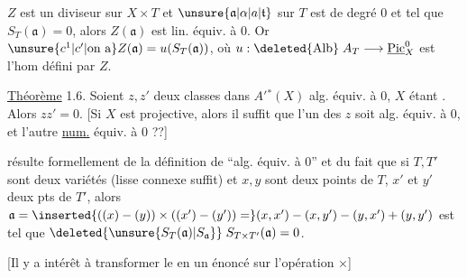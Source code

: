 $Z$ est un diviseur sur $X\times T$ et $\unsure{\mathfrak{a}|\alpha|a|\mathfrak{t}}$ sur $T$ est de degré $0$ et tel que $S_T(\mathfrak{a})=0$, alors $Z(\mathfrak{a})$ est lin. équiv. à $0$. Or $\unsure{c^1|c'|\text{on a}}Z(\mathfrak{a})=u(S_T(\mathfrak{a}))$, où $u:\deleted{\mathrm{Alb}}\;A_T\longrightarrow\underline{\mathrm{Pic}}_X^0$ est l'hom défini par $Z$.

\uline{Théorème} 1.6. Soient $z,z'$ deux classes dans $A'{}^*(X)$ alg. équiv. à $0$, $X$ étant \deleted{[projective]}. Alors $zz'=0$. [Si $X$ est projective, alors il suffit que l'un des  $z$ soit alg. équiv. à $0$, et l'autre \uline{num.} équiv. à $0$ ??]


 résulte formellement de la définition de ``alg. équiv. à $0$''  et du fait que si $T,T'$ sont deux  variétés  (lisse connexe suffit) et $x,y$ sont deux points de $T$, $x'$ et $y'$ deux pts de $T'$, alors $\mathfrak{a}=\inserted{((x)-(y))\times((x')-(y'))=}(x,x')-(x,y')-(y,x')+(y,y')$ est tel que $\deleted{\unsure{S_T(\mathfrak{a})|S_{\mathfrak{a}}}}\;S_{T\times T'}(\mathfrak{a})=0$.



[Il y a intérêt à transformer le  en un énoncé sur l'opération $\times$]

